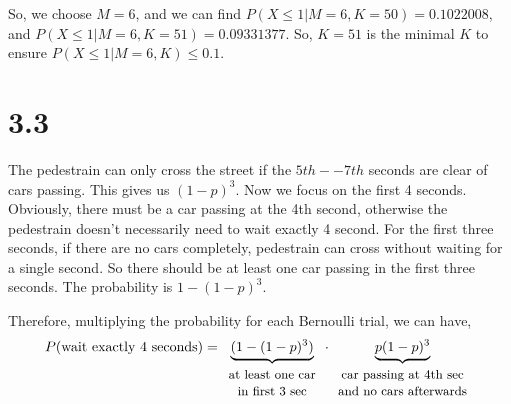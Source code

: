 \documentclass[letterpaper]{article}
\begin{document}
\begin{enumerate}[(a)]
    So, we choose $M=6$, and we can find $P(X \le 1|M=6, K=50) = 0.1022008$, and $P(X \le 1|M=6,K=51) = 0.09331377$. So, $K=51$ is the minimal $K$ to ensure $P(X \le 1|M=6, K) \le 0.1$.
    \end{enumerate}

    \section*{3.3}
    The pedestrain can only cross the street if the $5th--7th$ seconds are clear of cars passing. This gives us $(1-p)^3$. Now we focus on the first 4 seconds. Obviously, there must be a car passing at the 4th second, otherwise the pedestrain doesn't necessarily need to wait exactly 4 second.
    For the first three seconds, if there are no cars completely, pedestrain can cross without waiting for a single second. So there should be at least one car passing in the first three seconds. The probability is $1-(1-p)^3$.

    Therefore, multiplying the probability for each Bernoulli trial, we can have,
    \[
    P(\text{wait exactly 4 seconds}) = \underbrace{(1-(1-p)^3)}_{\begin{array}{c}\text{\small at least one car} \\ \text{\small in first 3 sec}\end{array}}\cdot \underbrace{p(1-p)^3}_{\begin{array}{c}\text{\small car passing at 4th sec}\\ \text{\small and no cars afterwards}\end{array}}
    \]
\end{document}
